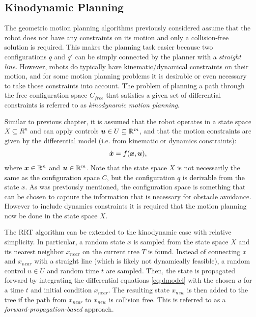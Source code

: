 \subsection{Kinodynamic Planning}
The geometric motion planning algorithms previously considered assume that the robot does not have any constraints on its motion and only a collision-free solution is required. This makes the planning task easier because two configurations $q$ and $q'$ can be simply connected by the planner with a \textit{straight line}. However, robots do typically have kinematic/dynamical constraints on their motion, and for some motion planning problems it is desirable or even necessary to take those constraints into account.
The problem of planning a path through the free configuration space $C_{free}$ that satisfies a given set of differential constraints is referred to as \textit{kinodynamic motion planning}\cite{SchmerlingJansonEtAl2015}. 

Similar to previous chapter, it is assumed that the robot operates in a state space $X\subseteq R^n$ and can apply controls $\bm{u} \in U \subseteq \mathbb{R}^m$, and that the motion constraints are given by the differential model (i.e. from kinematic or dynamics constraints):
\begin{equation} \label{eq:dmodel}
\dot{\bm{x}} = f(\bm{x},\bm{u}),
\end{equation}
where $\bm{x} \in \mathbb{R}^n$ and $\bm{u} \in \mathbb{R}^m$. Note that the state space $X$ is not necessarily the same as the configuration space $C$, but the configuration $q$ is derivable from the state $x$. As was previously mentioned, the configuration space is something that can be chosen to capture the information that is necessary for obstacle avoidance. However to include dynamics constraints it is required that the motion planning now be done in the state space $X$.

The RRT algorithm can be extended to the kinodynamic case with relative simplicity. In particular, a random state $x$ is sampled from the state space $X$ and its nearest neighbor $x_{near}$ on the current tree $T$ is found. Instead of connecting $x$ and $x_{near}$ with a straight line (which is likely not dynamically feasible), a random control $u \in U$ and random time $t$ are sampled. Then, the state is propagated forward by integrating the differential equations \eqref{eq:dmodel} with the chosen $u$ for a time $t$ and initial condition $x_{near}$. The resulting state $x_{new}$ is then added to the tree if the path from $x_{near}$ to $x_{new}$ is collision free. This is referred to as a \textit{forward-propagation-based} approach.

